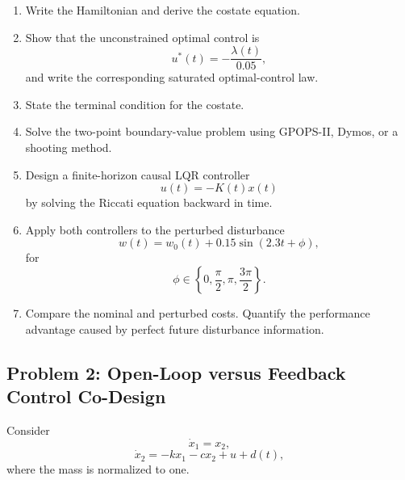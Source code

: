 \begin{enumerate}
    \item Write the Hamiltonian and derive the costate equation.

    \item Show that the unconstrained optimal control is
    \begin{equation}
    u^*(t)=-\frac{\lambda(t)}{0.05},
    \end{equation}
    and write the corresponding saturated optimal-control law.

    \item State the terminal condition for the costate.

    \item Solve the two-point boundary-value problem using GPOPS-II, Dymos,
    or a shooting method.

    \item Design a finite-horizon causal LQR controller
    \begin{equation}
    u(t)=-K(t)x(t)
    \end{equation}
    by solving the Riccati equation backward in time.

    \item Apply both controllers to the perturbed disturbance
    \begin{equation}
    w(t)=w_0(t)+0.15\sin(2.3t+\phi),
    \end{equation}
    for
    \begin{equation}
    \phi\in
    \left\{
    0,\frac{\pi}{2},\pi,\frac{3\pi}{2}
    \right\}.
    \end{equation}

    \item Compare the nominal and perturbed costs. Quantify the performance
    advantage caused by perfect future disturbance information.
\end{enumerate}


\subsection*{Problem 2: Open-Loop versus Feedback Control Co-Design}

Consider
\begin{equation}
\dot{x}_1=x_2,
\end{equation}
\begin{equation}
\dot{x}_2=-kx_1-cx_2+u+d(t),
\end{equation}
where the mass is normalized to one.

